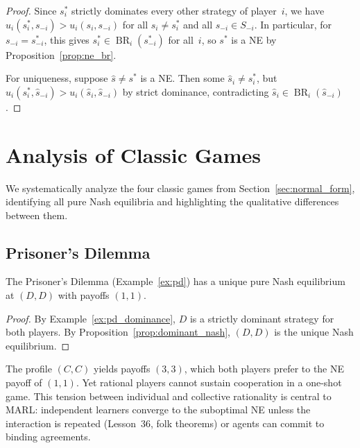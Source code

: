 \documentclass[11pt,a4paper]{article}
\DeclareMathOperator{\BR}{BR}
\begin{document}
\begin{proof}
Since $s_i^*$ strictly dominates every other strategy of player~$i$, we have
$u_i(s_i^*, s_{-i}) > u_i(s_i, s_{-i})$ for all $s_i \neq s_i^*$ and all
$s_{-i} \in S_{-i}$.  In particular, for $s_{-i} = s_{-i}^*$, this gives
$s_i^* \in \BR_i(s_{-i}^*)$ for all~$i$, so $s^*$ is a NE by
Proposition~\ref{prop:ne_br}.

For uniqueness, suppose $\hat{s} \neq s^*$ is a NE.  Then some
$\hat{s}_i \neq s_i^*$, but $u_i(s_i^*, \hat{s}_{-i}) > u_i(\hat{s}_i,
\hat{s}_{-i})$ by strict dominance, contradicting $\hat{s}_i \in
\BR_i(\hat{s}_{-i})$.
\end{proof}


\section{Analysis of Classic Games}
\label{sec:classics}

We systematically analyze the four classic games from
Section~\ref{sec:normal_form}, identifying all pure Nash equilibria and
highlighting the qualitative differences between them.

\subsection{Prisoner's Dilemma}
\label{subsec:pd_analysis}

\begin{proposition}
\label{prop:pd_ne}
The Prisoner's Dilemma (Example~\ref{ex:pd}) has a unique pure Nash
equilibrium at $(D, D)$ with payoffs $(1, 1)$.
\end{proposition}

\begin{proof}
By Example~\ref{ex:pd_dominance}, $D$ is a strictly dominant strategy for
both players.  By Proposition~\ref{prop:dominant_nash}, $(D, D)$ is the
unique Nash equilibrium.
\end{proof}

\begin{remark}
\label{rem:pd_paradox}
The profile $(C,C)$ yields payoffs $(3,3)$, which both players prefer to
the NE payoff of $(1,1)$.  Yet rational players cannot sustain cooperation
in a one-shot game.  This tension between individual and collective
rationality is central to MARL: independent learners converge to the
suboptimal NE unless the interaction is repeated (Lesson~36, folk theorems)
or agents can commit to binding agreements.
\end{remark}
\end{document}
